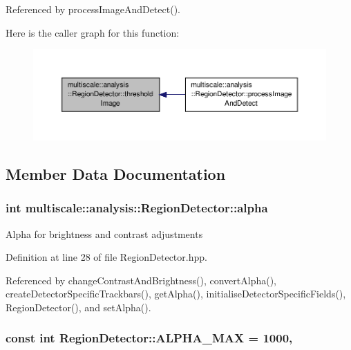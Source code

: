 Referenced by process\-Image\-And\-Detect().



Here is the caller graph for this function\-:
\nopagebreak
\begin{figure}[H]
\begin{center}
\leavevmode
\includegraphics[width=350pt]{classmultiscale_1_1analysis_1_1RegionDetector_a614cd80fac5d3df2a25c401bb221149c_icgraph}
\end{center}
\end{figure}




\subsection{Member Data Documentation}
\hypertarget{classmultiscale_1_1analysis_1_1RegionDetector_ab768a3bbfff9835b441a889ab2cb05a6}{
\subsubsection[{alpha}]{\setlength{\rightskip}{0pt plus 5cm}int multiscale\-::analysis\-::\-Region\-Detector\-::alpha\hspace{0.3cm}{\ttfamily [private]}}}\label{classmultiscale_1_1analysis_1_1RegionDetector_ab768a3bbfff9835b441a889ab2cb05a6}
Alpha for brightness and contrast adjustments 

Definition at line 28 of file Region\-Detector.\-hpp.



Referenced by change\-Contrast\-And\-Brightness(), convert\-Alpha(), create\-Detector\-Specific\-Trackbars(), get\-Alpha(), initialise\-Detector\-Specific\-Fields(), Region\-Detector(), and set\-Alpha().

\hypertarget{classmultiscale_1_1analysis_1_1RegionDetector_a7ca1e136dc9d768f1e11cd6f770d950f}{
\subsubsection[{A\-L\-P\-H\-A\-\_\-\-M\-A\-X}]{\setlength{\rightskip}{0pt plus 5cm}const int Region\-Detector\-::\-A\-L\-P\-H\-A\-\_\-\-M\-A\-X = 1000\hspace{0.3cm}{\ttfamily [static]}, {\ttfamily [private]}}}\label{classmultiscale_1_1analysis_1_1RegionDetector_a7ca1e136dc9d768f1e11cd6f770d950f}


